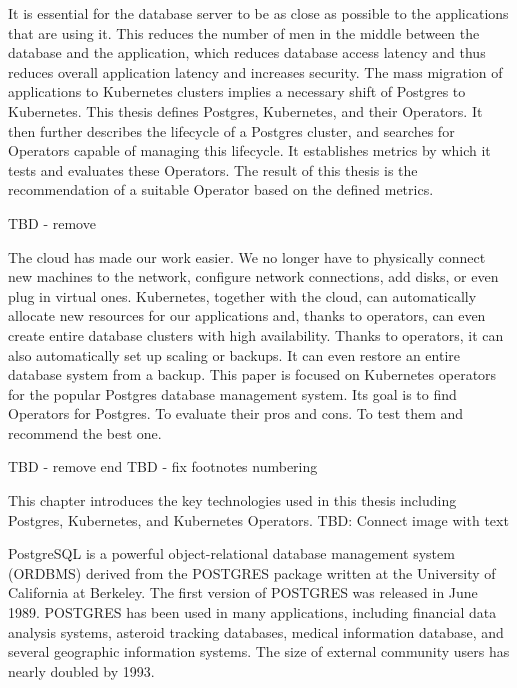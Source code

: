 
It is essential for the database server to be as close as possible to the applications that are using it. This reduces the number of men in the middle between the database and the application, which reduces database access latency and thus reduces overall application latency and increases security. The mass migration of applications to Kubernetes clusters implies a necessary shift of Postgres to Kubernetes. This thesis defines Postgres, Kubernetes, and their Operators. It then further describes the lifecycle of a Postgres cluster, and searches for Operators capable of managing this lifecycle. It establishes metrics by which it tests and evaluates these Operators.  The result of this thesis is the recommendation of a suitable Operator based on the defined metrics.

TBD - remove

The cloud has made our work easier. We no longer have to physically connect new machines to the network, configure network connections, add disks, or even plug in virtual ones. Kubernetes, together with the cloud, can automatically allocate new resources for our applications and, thanks to operators, can even create entire database clusters with high availability. Thanks to operators, it can also automatically set up scaling or backups. It can even restore an entire database system from a backup. This paper is focused on Kubernetes operators for the popular Postgres database management system. Its goal is to find Operators for Postgres. To evaluate their pros and cons. To test them and recommend the best one.

TBD - remove end
TBD - fix footnotes numbering


This chapter introduces the key technologies used in this thesis including Postgres, Kubernetes, and Kubernetes Operators.
TBD: Connect image with text

PostgreSQL is a powerful object-relational database management system (ORDBMS) derived from the POSTGRES package written at the University of California at Berkeley. \cite{docuPgwhatIsPg} \cite{pg14introduction} The first version of POSTGRES was released in June 1989. POSTGRES has been used in many applications, including financial data analysis systems, asteroid tracking databases, medical information database, and several geographic information systems. The size of external community users has nearly doubled by 1993. \cite{docuPgBriefHistory}

